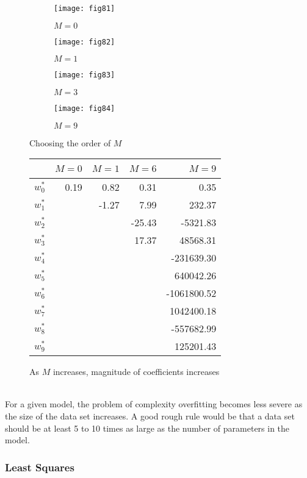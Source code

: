 \documentclass[11pt]{article} %
\begin{document}
\begin{figure}
\centering
\begin{subfigure}[t]{0.23\linewidth}
\texttt{[image: fig81]}
\caption{$M=0$}
\end{subfigure}
\begin{subfigure}[t]{0.23\linewidth}
\texttt{[image: fig82]}
\caption{$M=1$}
\end{subfigure}
\begin{subfigure}[t]{0.23\linewidth}
\texttt{[image: fig83]}
\caption{$M=3$}
\end{subfigure}
\begin{subfigure}[t]{0.23\linewidth}
\texttt{[image: fig84]}
\caption{$M=9$}
\end{subfigure}
\caption{Choosing the order of $M$}
\end{figure}

\begin{figure}
\centering
\begin{tabular}{r | r r r r}
~ & $M=0$ & $M=1$ & $M=6$ & $M=9$ \\
\hline
$w^{\ast}_0$ & 0.19 & 0.82 & 0.31 & 0.35 \\
$w^{\ast}_1$ & & -1.27 & 7.99 & 232.37 \\
$w^{\ast}_2$ & & & -25.43 & -5321.83 \\
$w^{\ast}_3$ & & & 17.37 & 48568.31 \\
$w^{\ast}_4$ & & & & -231639.30 \\
$w^{\ast}_5$ & & & & 640042.26 \\
$w^{\ast}_6$ & & & & -1061800.52 \\
$w^{\ast}_7$ & & & & 1042400.18 \\
$w^{\ast}_8$ & & & & -557682.99 \\
$w^{\ast}_9$ & & & & 125201.43
\end{tabular}
\caption{As $M$ increases, magnitude of coefficients increases}
\end{figure}
~\\
For a given model, the problem of complexity overfitting becomes less severe as the size of the data set increases. A good rough rule would be that a data set should be at least 5 to 10 times as large as the number of parameters in the model.

\subsubsection{Least Squares}
\end{document}
